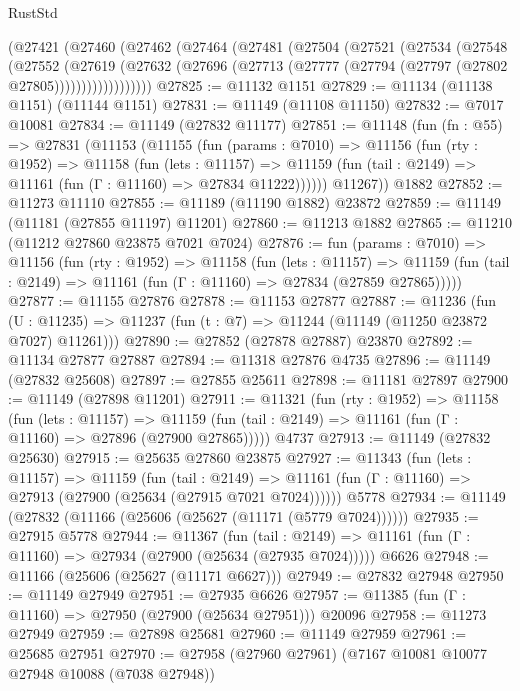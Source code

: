\begin{lexlean}{RustStd}
\begin{coremodule}
    (@27421
      (@27460
        (@27462
          (@27464
            (@27481
              (@27504
                (@27521
                  (@27534
                    (@27548
                      (@27552
                        (@27619
                          (@27632
                            (@27696 (@27713 (@27777 (@27794 (@27797 (@27802 @27805))))))))))))))))))
@27825 := @11132 @1151
@27829 := @11134 (@11138 @1151) (@11144 @1151)
@27831 := @11149 (@11108 @11150)
@27832 := @7017 @10081
@27834 := @11149 (@27832 @11177)
@27851 := @11148
    (fun (fn : @55) =>
    @27831
      (@11153
        (@11155
          (fun (params : @7010) =>
          @11156
            (fun (rty : @1952) =>
            @11158
              (fun (lets : @11157) =>
              @11159 (fun (tail : @2149) => @11161 (fun (Γ : @11160) => @27834 @11222))))))
        @11267))
    @1882
@27852 := @11273 @11110
@27855 := @11189 (@11190 @1882) @23872
@27859 := @11149 (@11181 (@27855 @11197) @11201)
@27860 := @11213 @1882
@27865 := @11210 (@11212 @27860 @23875 @7021 @7024)
@27876 := fun (params : @7010) =>
  @11156
    (fun (rty : @1952) =>
    @11158
      (fun (lets : @11157) =>
      @11159 (fun (tail : @2149) => @11161 (fun (Γ : @11160) => @27834 (@27859 @27865)))))
@27877 := @11155 @27876
@27878 := @11153 @27877
@27887 := @11236
    (fun (U : @11235) => @11237 (fun (t : @7) => @11244 (@11149 (@11250 @23872 @7027) @11261)))
@27890 := @27852 (@27878 @27887) @23870
@27892 := @11134 @27877 @27887
@27894 := @11318 @27876 @4735
@27896 := @11149 (@27832 @25608)
@27897 := @27855 @25611
@27898 := @11181 @27897
@27900 := @11149 (@27898 @11201)
@27911 := @11321
    (fun (rty : @1952) =>
    @11158
      (fun (lets : @11157) =>
      @11159 (fun (tail : @2149) => @11161 (fun (Γ : @11160) => @27896 (@27900 @27865)))))
    @4737
@27913 := @11149 (@27832 @25630)
@27915 := @25635 @27860 @23875
@27927 := @11343
    (fun (lets : @11157) =>
    @11159
      (fun (tail : @2149) =>
      @11161 (fun (Γ : @11160) => @27913 (@27900 (@25634 (@27915 @7021 @7024))))))
    @5778
@27934 := @11149 (@27832 (@11166 (@25606 (@25627 (@11171 (@5779 @7024))))))
@27935 := @27915 @5778
@27944 := @11367
    (fun (tail : @2149) => @11161 (fun (Γ : @11160) => @27934 (@27900 (@25634 (@27935 @7024)))))
    @6626
@27948 := @11166 (@25606 (@25627 (@11171 @6627)))
@27949 := @27832 @27948
@27950 := @11149 @27949
@27951 := @27935 @6626
@27957 := @11385 (fun (Γ : @11160) => @27950 (@27900 (@25634 @27951))) @20096
@27958 := @11273 @27949
@27959 := @27898 @25681
@27960 := @11149 @27959
@27961 := @25685 @27951
@27970 := @27958 (@27960 @27961) (@7167 @10081 @10077 @27948 @10088 (@7038 @27948))

\end{coremodule}
\end{lexlean}
